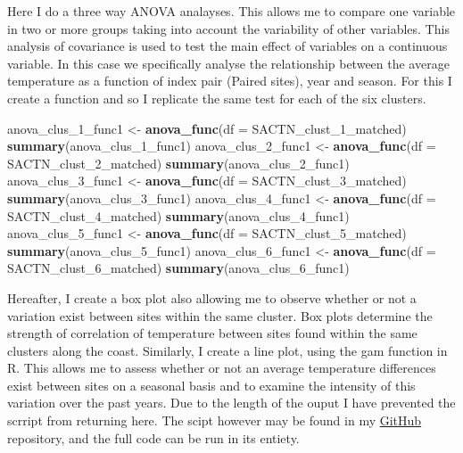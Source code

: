 \documentclass[10pt,a4,]{article}
\newenvironment{Shaded}{\begin{snugshade}}{\end{snugshade}}
\newcommand{\DataTypeTok}[1]{\textcolor[rgb]{0.13,0.29,0.53}{#1}}
\newcommand{\DecValTok}[1]{\textcolor[rgb]{0.00,0.00,0.81}{#1}}
\newcommand{\KeywordTok}[1]{\textcolor[rgb]{0.13,0.29,0.53}{\textbf{#1}}}
\newcommand{\NormalTok}[1]{#1}
\newcommand{\StringTok}[1]{\textcolor[rgb]{0.31,0.60,0.02}{#1}}
\begin{document}
Here I do a three way ANOVA analayses. This allows me to compare one
variable in two or more groups taking into account the variability of
other variables. This analysis of covariance is used to test the main
effect of variables on a continuous variable. In this case we
specifically analyse the relationship between the average temperature as
a function of index pair (Paired sites), year and season. For this I
create a function and so I replicate the same test for each of the six
clusters.

\begin{Shaded}
\begin{Highlighting}[]
\NormalTok{anova_clus_}\DecValTok{1}\NormalTok{_func1 <-}\StringTok{ }\KeywordTok{anova_func}\NormalTok{(}\DataTypeTok{df =}\NormalTok{ SACTN_clust_}\DecValTok{1}\NormalTok{_matched)}
\KeywordTok{summary}\NormalTok{(anova_clus_}\DecValTok{1}\NormalTok{_func1)}
\NormalTok{anova_clus_}\DecValTok{2}\NormalTok{_func1 <-}\StringTok{ }\KeywordTok{anova_func}\NormalTok{(}\DataTypeTok{df =}\NormalTok{ SACTN_clust_}\DecValTok{2}\NormalTok{_matched)}
\KeywordTok{summary}\NormalTok{(anova_clus_}\DecValTok{2}\NormalTok{_func1)}
\NormalTok{anova_clus_}\DecValTok{3}\NormalTok{_func1 <-}\StringTok{ }\KeywordTok{anova_func}\NormalTok{(}\DataTypeTok{df =}\NormalTok{ SACTN_clust_}\DecValTok{3}\NormalTok{_matched)}
\KeywordTok{summary}\NormalTok{(anova_clus_}\DecValTok{3}\NormalTok{_func1)}
\NormalTok{anova_clus_}\DecValTok{4}\NormalTok{_func1 <-}\StringTok{ }\KeywordTok{anova_func}\NormalTok{(}\DataTypeTok{df =}\NormalTok{ SACTN_clust_}\DecValTok{4}\NormalTok{_matched)}
\KeywordTok{summary}\NormalTok{(anova_clus_}\DecValTok{4}\NormalTok{_func1)}
\NormalTok{anova_clus_}\DecValTok{5}\NormalTok{_func1 <-}\StringTok{ }\KeywordTok{anova_func}\NormalTok{(}\DataTypeTok{df =}\NormalTok{ SACTN_clust_}\DecValTok{5}\NormalTok{_matched)}
\KeywordTok{summary}\NormalTok{(anova_clus_}\DecValTok{5}\NormalTok{_func1)}
\NormalTok{anova_clus_}\DecValTok{6}\NormalTok{_func1 <-}\StringTok{ }\KeywordTok{anova_func}\NormalTok{(}\DataTypeTok{df =}\NormalTok{ SACTN_clust_}\DecValTok{6}\NormalTok{_matched)}
\KeywordTok{summary}\NormalTok{(anova_clus_}\DecValTok{6}\NormalTok{_func1)}
\end{Highlighting}
\end{Shaded}

Hereafter, I create a box plot also allowing me to observe whether or
not a variation exist between sites within the same cluster. Box plots
determine the strength of correlation of temperature between sites found
within the same clusters along the coast. Similarly, I create a line
plot, using the gam function in R. This allows me to assess whether or
not an average temperature differences exist between sites on a seasonal
basis and to examine the intensity of this variation over the past
years. Due to the length of the ouput I have prevented the scrript from
returning here. The scipt however may be found in my
\href{https://github.com/amierohabrahams/HONOURSPROJECT}{GitHub}
repository, and the full code can be run in its entiety.
\end{document}
